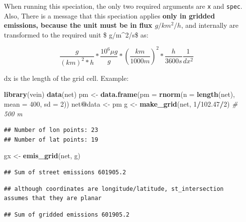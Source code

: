 \documentclass[12pt,graybox,envcountchap,sectrefs]{krantz}
\makeatletter
\newenvironment{Shaded}{\begin{snugshade}}{\end{snugshade}}
\newcommand{\KeywordTok}[1]{\textcolor[rgb]{0.13,0.29,0.53}{\textbf{#1}}}
\newcommand{\DataTypeTok}[1]{\textcolor[rgb]{0.13,0.29,0.53}{#1}}
\newcommand{\DecValTok}[1]{\textcolor[rgb]{0.00,0.00,0.81}{#1}}
\newcommand{\FloatTok}[1]{\textcolor[rgb]{0.00,0.00,0.81}{#1}}
\newcommand{\StringTok}[1]{\textcolor[rgb]{0.31,0.60,0.02}{#1}}
\newcommand{\CommentTok}[1]{\textcolor[rgb]{0.56,0.35,0.01}{\textit{#1}}}
\newcommand{\OperatorTok}[1]{\textcolor[rgb]{0.81,0.36,0.00}{\textbf{#1}}}
\newcommand{\NormalTok}[1]{#1}
\newenvironment{kframe}{%
\medskip{}
\setlength{\fboxsep}{.8em}
 \def\at@end@of@kframe{}%
 \ifinner\ifhmode%
  \def\at@end@of@kframe{\end{minipage}}%
  \begin{minipage}{\columnwidth}%
 \fi\fi%
 \def\FrameCommand##1{\hskip\@totalleftmargin \hskip-\fboxsep
 \colorbox{shadecolor}{##1}\hskip-\fboxsep
     \hskip-\linewidth \hskip-\@totalleftmargin \hskip\columnwidth}%
 \MakeFramed {\advance\hsize-\width
   \@totalleftmargin\z@ \linewidth\hsize
   \@setminipage}}%
 {\par\unskip\endMakeFramed%
 \at@end@of@kframe}
\renewenvironment{Shaded}{\begin{kframe}}{\end{kframe}}
\theoremstyle{definition}
\theoremstyle{definition}
\theoremstyle{definition}
\theoremstyle{remark}
\makeatother
\begin{document}
When running this speciation, the only two required arguments are
\texttt{x} and \texttt{spec}. Also, There is a message that this
speciation applies \textbf{only in gridded emissions, because the unit
must be in flux \(g/km^2/h\)}, and internally are transformed to the
required unit \$ \mu g/m\^{}2/s\$ as:

\[ \frac{g}{(km)^2*h}*\frac{10^6 \mu g}{g}*(\frac{km}{1000m})^2*\frac{h}{3600s}\frac{1}{dx^2}\]

dx is the length of the grid cell. Example:

\begin{Shaded}
\begin{Highlighting}[]
\KeywordTok{library}\NormalTok{(vein)}
\KeywordTok{data}\NormalTok{(net)}
\NormalTok{pm <-}\StringTok{ }\KeywordTok{data.frame}\NormalTok{(}\DataTypeTok{pm =} \KeywordTok{rnorm}\NormalTok{(}\DataTypeTok{n =} \KeywordTok{length}\NormalTok{(net), }\DataTypeTok{mean =} \DecValTok{400}\NormalTok{, }\DataTypeTok{sd =} \DecValTok{2}\NormalTok{))}
\NormalTok{net}\OperatorTok{@}\NormalTok{data <-}\StringTok{ }\NormalTok{pm}
\NormalTok{g <-}\StringTok{ }\KeywordTok{make_grid}\NormalTok{(net, }\DecValTok{1}\OperatorTok{/}\FloatTok{102.47}\OperatorTok{/}\DecValTok{2}\NormalTok{) }\CommentTok{# 500 m}
\end{Highlighting}
\end{Shaded}

\begin{verbatim}
## Number of lon points: 23
## Number of lat points: 19
\end{verbatim}

\begin{Shaded}
\begin{Highlighting}[]
\NormalTok{gx <-}\StringTok{ }\KeywordTok{emis_grid}\NormalTok{(net, g)}
\end{Highlighting}
\end{Shaded}

\begin{verbatim}
## Sum of street emissions 601905.2
\end{verbatim}

\begin{verbatim}
## although coordinates are longitude/latitude, st_intersection assumes that they are planar
\end{verbatim}

\begin{verbatim}
## Sum of gridded emissions 601905.2
\end{verbatim}
\end{document}
